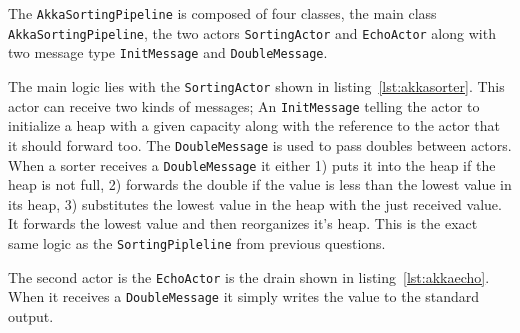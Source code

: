 \documentclass{ituhandin}
\begin{document}
The \texttt{AkkaSortingPipeline} is composed of four classes, the main class \texttt{AkkaSortingPipeline}, the two actors \texttt{SortingActor} and \texttt{EchoActor} along with two message type \texttt{InitMessage} and \texttt{DoubleMessage}. 

The main logic lies with the \texttt{SortingActor} shown in listing~\ref{lst:akkasorter}. This actor can receive two kinds of messages; An \texttt{InitMessage} telling the actor to initialize a heap with a given capacity along with the reference to the actor that it should forward too. The \texttt{DoubleMessage} is used to pass doubles between actors. When a sorter receives a \texttt{DoubleMessage} it either 1) puts it into the heap if the heap is not full, 2) forwards the double if  the value is less than the lowest value in its heap, 3) substitutes the lowest value in the heap with the just received value. It forwards the lowest value and then reorganizes it's heap. This is the exact same logic as the \texttt{SortingPipleline} from previous questions.

The second actor is the \texttt{EchoActor} is the drain shown in listing~\ref{lst:akkaecho}. When it receives a \texttt{DoubleMessage} it simply writes the value to the standard output.
\end{document}
